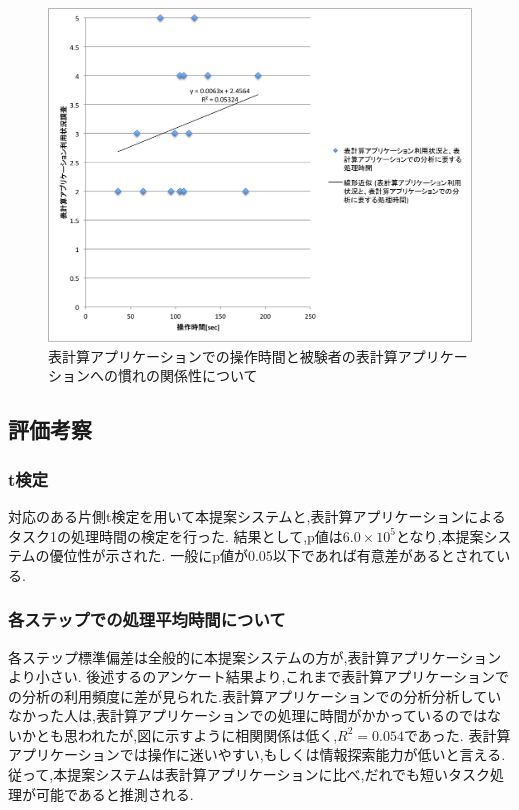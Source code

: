 \documentclass[sotsuron]{kuee}
\begin{document}
			\begin{figure}
				\begin{center}
					\includegraphics[width=\linewidth]{./png/result05.png}
				\end{center}
				\caption{表計算アプリケーションでの操作時間と被験者の表計算アプリケーションへの慣れの関係性について}
		  		\label{fig:result05}
			\end{figure}
		\subsection{評価考察}
			\subsubsection{t検定}
				対応のある片側t検定を用いて本提案システムと,表計算アプリケーションによるタスク1の処理時間の検定を行った.
				結果として,p値は$6.0 \times 10^5$となり,本提案システムの優位性が示された.
				一般にp値が$0.05$以下であれば有意差があるとされている.
			\subsubsection{各ステップでの処理平均時間について}
				各ステップ標準偏差は全般的に本提案システムの方が,表計算アプリケーションより小さい.
				後述するのアンケート結果より,これまで表計算アプリケーションでの分析の利用頻度に差が見られた.表計算アプリケーションでの分析分析していなかった人は,表計算アプリケーションでの処理に時間がかかっているのではないかとも思われたが,図に示すように相関関係は低く,$R^2 = 0.054$であった.
				表計算アプリケーションでは操作に迷いやすい,もしくは情報探索能力が低いと言える.
				従って,本提案システムは表計算アプリケーションに比べ,だれでも短いタスク処理が可能であると推測される.
\end{document}
